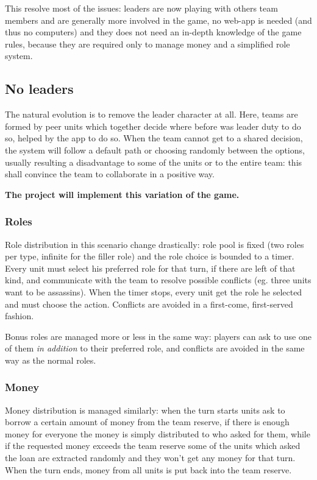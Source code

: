 			This resolve most of the issues: leaders are now playing with others team members and are generally more involved in the game, no web-app is needed (and thus no computers) and they does not need an in-depth knowledge of the game rules, because they are required only to manage money and a simplified role system.
		
		\subsection{No leaders}
		
			The natural evolution is to remove the leader character at all.
			Here, teams are formed by peer units which together decide where before was leader duty to do so, helped by the app to do so.
			When the team cannot get to a shared decision, the system will follow a default path or choosing randomly between the options, usually resulting a disadvantage to some of the units or to the entire team: this shall convince the team to collaborate in a positive way.
			
			\textbf{The project will implement this variation of the game.}
			
			\subsubsection{Roles}
			\label{nolead:role}
				Role distribution in this scenario change drastically: role pool is fixed (two roles per type, infinite for the filler role) and the role choice is bounded to a timer.
				Every unit must select his preferred role for that turn, if there are left of that kind, and communicate with the team to resolve possible conflicts (eg. three units want to be assassins).
				When the timer stops, every unit get the role he selected and must choose the action. Conflicts are avoided in a first-come, first-served fashion.
				
				Bonus roles are managed more or less in the same way: players can ask to use one of them \emph{in addition} to their preferred role, and conflicts are avoided in the same way as the normal roles.
							
			\subsubsection{Money}
			\label{nolead:money}
				Money distribution is managed similarly: when the turn starts units ask to borrow a certain amount of money from the team reserve, if there is enough money for everyone the money is simply distributed to who asked for them, while if the requested money exceeds the team reserve some of the units which asked the loan are extracted randomly and they won't get any money for that turn.
				When the turn ends, money from all units is put back into the team reserve.
				
